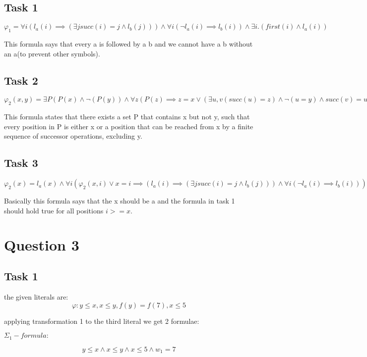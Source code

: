 \documentclass{article}
\begin{document}
\subsection{Task 1}
$\varphi_1 = \forall i (l_a(i) \implies (\exists j succ(i) = j \land l_b(j))) \land \forall i (\neg l_a(i) \implies l_b(i)) \land \exists i. (first(i) \land l_a(i))$

This formula says that every a is followed by a b and we cannot have a b without an a(to prevent other symbols).

\subsection{Task 2}

$\varphi_2(x,y) = \exists P (P(x) \land \neg(P(y)) \land \forall z(P(z) \implies z=x \lor (\exists u,v (succ(u) = z) \land \neg(u = y) \land succ(v) = u \land \neg(P(v)))))$

This formula states that there exists a set P that contains x but not y, such that every position in P is either x or a position that can be reached from x by a finite sequence of successor operations, excluding y.

\subsection{Task 3}

$\varphi_2(x) = l_a(x) \land \forall i (\varphi_2(x,i) \lor x = i \implies (l_a(i) \implies (\exists j succ(i) = j \land l_b(j))) \land \forall i (\neg l_a(i) \implies l_b(i)))$

Basically this formula says that the x should be a and the formula in task 1 should hold true for all positions $i >= x.$

\section{Question 3}

\subsection{Task 1}

the given literals are:
$$\varphi: y \leq x, x \leq y, f(y) = f(7) , x \leq 5$$

applying transformation 1 to the third literal we get 2 formulae:

$\Sigma_1 - formula:$

$$y \leq x \land x\leq y \land x \leq 5 \land w_1 = 7$$
\end{document}
